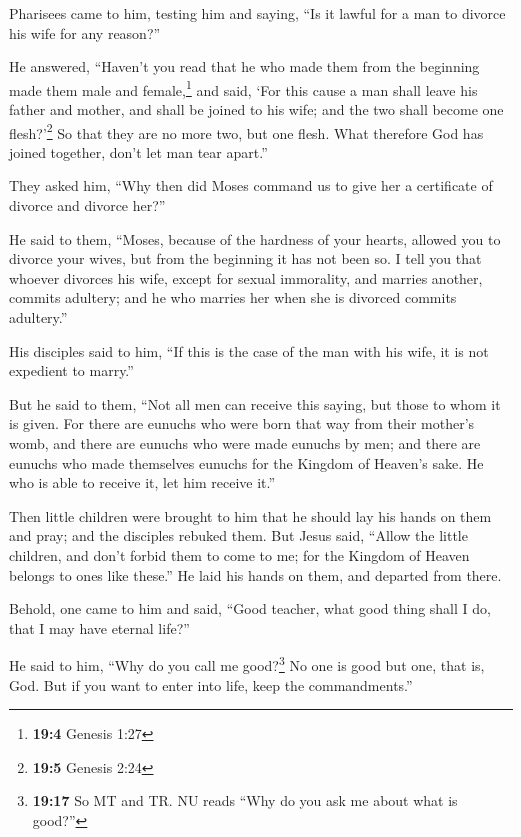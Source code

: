  Pharisees came to him, testing him and saying, ``Is it
lawful for a man to divorce his wife for any reason?''

 He answered, ``Haven't you read that he who made them
from the beginning made them male and female,\footnote{\textbf{19:4}
  Genesis 1:27}  and said, `For this cause a man shall
leave his father and mother, and shall be joined to his wife; and the
two shall become one flesh?'\footnote{\textbf{19:5} Genesis 2:24}
 So that they are no more two, but one flesh. What
therefore God has joined together, don't let man tear apart.''

 They asked him, ``Why then did Moses command us to give
her a certificate of divorce and divorce her?''

 He said to them, ``Moses, because of the hardness of your
hearts, allowed you to divorce your wives, but from the beginning it has
not been so.  I tell you that whoever divorces his wife,
except for sexual immorality, and marries another, commits adultery; and
he who marries her when she is divorced commits adultery.''

 His disciples said to him, ``If this is the case of the
man with his wife, it is not expedient to marry.''

 But he said to them, ``Not all men can receive this
saying, but those to whom it is given.  For there are
eunuchs who were born that way from their mother's womb, and there are
eunuchs who were made eunuchs by men; and there are eunuchs who made
themselves eunuchs for the Kingdom of Heaven's sake. He who is able to
receive it, let him receive it.''

 Then little children were brought to him that he should
lay his hands on them and pray; and the disciples rebuked them.
 But Jesus said, ``Allow the little children, and don't
forbid them to come to me; for the Kingdom of Heaven belongs to ones
like these.''  He laid his hands on them, and departed
from there.

 Behold, one came to him and said, ``Good teacher, what
good thing shall I do, that I may have eternal life?''

 He said to him, ``Why do you call me good?\footnote{\textbf{19:17}
  So MT and TR. NU reads ``Why do you ask me about what is good?''} No
one is good but one, that is, God. But if you want to enter into life,
keep the commandments.''

